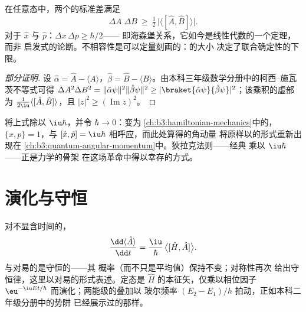 \begin{theorem}[一般的不确定性关系]\label{thm:b3:quantum-formalism:uncertainty}
在任意态中，两个的标准差满足
\[
\Delta A\;\Delta B \ \ge\ \tfrac12\,\big|\langle[\hat A, \hat
B]\rangle\big| .
\]
对于 $\hat x$ 与 $\hat p$：$\Delta x\,\Delta p \ge \hbar/2$——
即海森堡关系，它如今是线性代数的一个定理，而非
启发式的论断。不相容性是可以定量刻画的：的大小
决定了联合确定性的下限。
\end{theorem}

\begin{proof}[部分证明]
设 $\hat\alpha = \hat A - \langle A\rangle$，$\hat\beta = \hat B -
\langle B\rangle$。由本科三年级数学分册中的柯西–施瓦茨不等式可得
$\Delta A^2\Delta B^2 =
\|\hat\alpha\psi\|^2\|\hat\beta\psi\|^2 \ge
|\braket{\hat\alpha\psi}{\hat\beta\psi}|^2$；该乘积的虚部为
$\tfrac1{2\iu}\langle[\hat A, \hat B]\rangle$，且
$|z|^2 \ge (\operatorname{Im}z)^2$。
\end{proof}

\begin{remark}[经典影子]\label{rem:b3:quantum-formalism:poisson}
将上式除以 $\iu\hbar$，并令 $\hbar \to 0$：变为
\cref{ch:b3:hamiltonian-mechanics}中的，$\{x, p\} =
1$，与 $[\hat x, \hat p] = \iu\hbar$ 相呼应，而此处算得的角动量
将原样以的形式重新出现在
\cref{ch:b3:quantum-angular-momentum}中。狄拉克法则——经典
乘以 $\iu\hbar$——正是力学的骨架
在这场革命中得以幸存的方式。
\end{remark}

\section{演化与守恒}

\begin{proposition}\label{prop:b3:quantum-formalism:evolution}
对不显含时间的，
\[
\frac{\dd\langle\hat A\rangle}{\dd t}
 = \frac{\iu}{\hbar}\,\big\langle[\hat H, \hat A]\big\rangle .
\]
与对易的是守恒的——其
概率（而不只是平均值）保持不变；对称性再次
给出守恒律，这里以对易的形式表述。定态是
$\hat H$ 的本征矢，仅乘以相位因子
$\eu^{-\iu Et/\hbar}$ 而演化；两能级的叠加以
玻尔频率 $(E_2 - E_1)/h$ 拍动，正如本科二年级分册中的势阱
已经展示过的那样。
\end{proposition}

